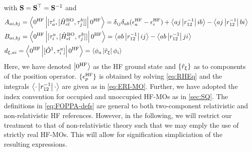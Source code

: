 with $\mathbf{S} = \mathbf{S}^\top = \mathbf{S}^{-1}$ and
\begin{subequations}
  \label{eq:FOPPA-defs}
\begin{align}
  &A_{ai,bj} = \left\langle 0^{\mathrm{HF}} \left\vert [\tau^i_a,[\hat{H}^{\mathrm{BO}}_{el}, \tau_j^b]] \right\vert 0^{\mathrm{HF}} \right\rangle = 
    \delta_{ij}\delta_{ab}(\epsilon^{\mathrm{HF}}_a - \epsilon^{\mathrm{HF}}_i) + \left\langle aj \left\vert r_{12}^{-1} \right\vert ib \right\rangle - \left\langle aj \left\vert r_{12}^{-1} \right\vert bi \right\rangle \\
  &B_{ai,bj} = \left\langle 0^{\mathrm{HF}} \left\vert [\tau^a_i,[\hat{H}^{\mathrm{BO}}_{el}, \tau_j^b]] \right\vert 0^{\mathrm{HF}} \right\rangle = 
    \left\langle ab \left\vert r_{12}^{-1} \right\vert ij \right\rangle - \left\langle ab \left\vert r_{12}^{-1} \right\vert ji \right\rangle \\
  &d_{\xi,ai} = \left\langle 0^{\mathrm{HF}} \left\vert [\hat{O}^1,\tau^{a}_i] \right\vert 0^{\mathrm{HF}} \right\rangle = \left\langle \phi_a \left\vert \hat{r}_\xi  \right\vert \phi_i \right\rangle
\end{align}
\end{subequations}
Here, we have denoted $\left\vert 0^{\mathrm{HF}} \right\rangle$ as the HF ground state and $\{\hat{r}_\xi\}$ as to components of the position
operator. $\{\epsilon^{\mathrm{HF}}_p\}$ is obtained by solving \cref{eq:RHEq} and the integrals $\left\langle \cdot \left\vert r^{-1}_{12} \right\vert \cdot \right\rangle$
are given as in \cref{eq:ERI-MO}. Further, we have adopted the index convention for occupied and unoccupied HF-MOs
as in \cref{sec:SQ}. The definitions in \cref{eq:FOPPA-defs} are general to both two-component relativistic and 
non-relativistic HF references. However, in the following, we will restrict our treatment to that of non-relativistic theory
such that we may emply the use of strictly real HF-MOs. This will allow for signification simpliciation of the resulting
expressions.


